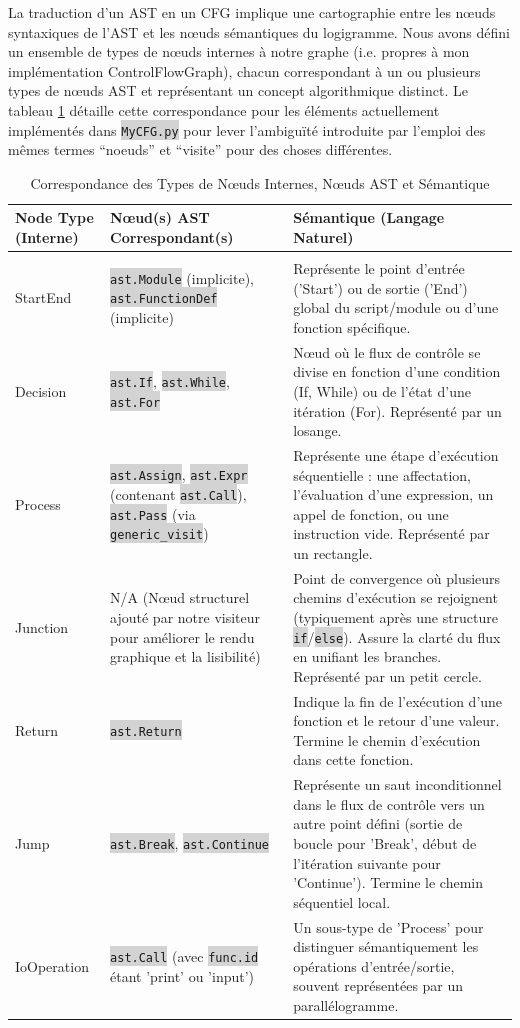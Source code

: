 \documentclass[11pt,a4paper]{article}
\newcommand{\code}[1]{\colorbox{lightgray}{\texttt{\small #1}}}
\begin{document}
La traduction d'un AST en un CFG implique une cartographie entre les nœuds syntaxiques de l'AST et les nœuds sémantiques du logigramme. Nous avons défini un ensemble de types de nœuds internes à notre graphe (i.e. propres à mon implémentation ControlFlowGraph), chacun correspondant à un ou plusieurs types de nœuds AST et représentant un concept algorithmique distinct. Le tableau \ref{tab:node-types} détaille cette correspondance pour les éléments actuellement implémentés dans \code{MyCFG.py} pour lever l'ambiguïté introduite par l'emploi des mêmes termes ``noeuds'' et ``visite'' pour des choses différentes.

\begin{longtable}{| p{3cm} | p{4cm} | p{8cm} |}
\caption{Correspondance des Types de Nœuds Internes, Nœuds AST et Sémantique}\label{tab:node-types}\\
\hline
\textbf{Node Type (Interne)} & \textbf{Nœud(s) AST Correspondant(s)} & \textbf{Sémantique (Langage Naturel)} \\
\hline
\endfirsthead
\hline
\endfoot
\hline
\multicolumn{3}{r}{\small\slshape} \\
\hline
\endlastfoot
StartEnd & \code{ast.Module} (implicite), \code{ast.FunctionDef} (implicite) & Représente le point d'entrée ('Start') ou de sortie ('End') global du script/module ou d'une fonction spécifique. \\ \hline
Decision & \code{ast.If}, \code{ast.While}, \code{ast.For} & Nœud où le flux de contrôle se divise en fonction d'une condition (If, While) ou de l'état d'une itération (For). Représenté par un losange. \\ \hline
Process & \code{ast.Assign}, \code{ast.Expr} (contenant \code{ast.Call}), \code{ast.Pass} (via \code{generic\_visit}) & Représente une étape d'exécution séquentielle : une affectation, l'évaluation d'une expression, un appel de fonction, ou une instruction vide. Représenté par un rectangle. \\ \hline
Junction & N/A (Nœud structurel ajouté par notre visiteur pour améliorer le rendu graphique et la lisibilité) & Point de convergence où plusieurs chemins d'exécution se rejoignent (typiquement après une structure \code{if}/\code{else}). Assure la clarté du flux en unifiant les branches. Représenté par un petit cercle. \\ \hline
Return & \code{ast.Return} & Indique la fin de l'exécution d'une fonction et le retour d'une valeur. Termine le chemin d'exécution dans cette fonction. \\ \hline
Jump & \code{ast.Break}, \code{ast.Continue} & Représente un saut inconditionnel dans le flux de contrôle vers un autre point défini (sortie de boucle pour 'Break', début de l'itération suivante pour 'Continue'). Termine le chemin séquentiel local. \\ \hline
IoOperation & \code{ast.Call} (avec \code{func.id} étant 'print' ou 'input') & Un sous-type de 'Process' pour distinguer sémantiquement les opérations d'entrée/sortie, souvent représentées par un parallélogramme. \\ \hline
\end{longtable}
\end{document}
